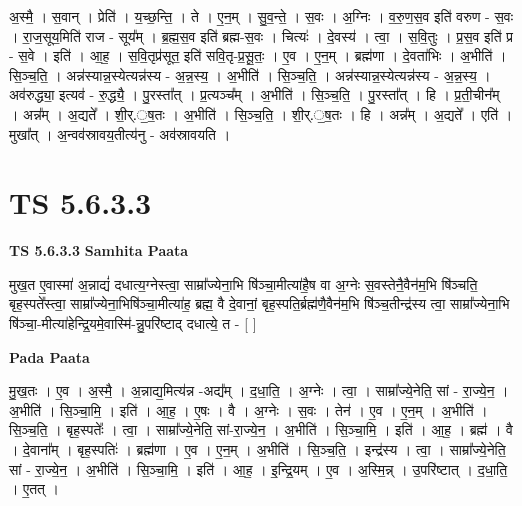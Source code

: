 \documentclass[17pt]{extarticle}
\begin{document}
अ॒स्मै॒ । स॒वान् । प्रेति॑ । य॒च्छ॒न्ति॒ । ते । ए॒न॒म् । सु॒व॒न्ते॒ । स॒वः । अ॒ग्निः । व॒रु॒ण॒स॒व इति॑ वरुण - स॒वः । रा॒ज॒सूय॒मिति॑ राज - सूय᳚म् । ब्र॒ह्म॒स॒व इति॑ ब्रह्म-स॒वः । चित्यः॑ । दे॒वस्य॑ । त्वा॒ । स॒वि॒तुः । प्र॒स॒व इति॑ प्र - स॒वे । इति॑ । आ॒ह॒ । स॒वि॒तृप्र॑सूत॒ इति॑ सवि॒तृ-प्र॒सू॒तः॒ । ए॒व । ए॒न॒म् । ब्रह्म॑णा । दे॒वता॑भिः । अ॒भीति॑ । सि॒ञ्च॒ति॒ । अन्न॑स्यान्न॒स्येत्यन्न॑स्य - अ॒न्न॒स्य॒ । अ॒भीति॑ । सि॒ञ्च॒ति॒ । अन्न॑स्यान्न॒स्येत्यन्न॑स्य - अ॒न्न॒स्य॒ । अव॑रुद्ध्या॒ इत्यव॑ - रु॒द्ध्यै॒ । पु॒रस्ता᳚त् । प्र॒त्यञ्च᳚म् । अ॒भीति॑ । सि॒ञ्च॒ति॒ । पु॒रस्ता᳚त् । हि । प्र॒ती॒चीन᳚म् । अन्न᳚म् । अ॒द्यते᳚ । शी॒र्.॒ष॒तः । अ॒भीति॑ । सि॒ञ्च॒ति॒ । शी॒र्.॒ष॒तः । हि । अन्न᳚म् । अ॒द्यते᳚ । एति॑ । मुखा᳚त् । अ॒न्वव॑स्रावय॒तीत्य॑नु - अव॑स्रावयति ।  \newline




\section*{ TS 5.6.3.3 }

\textbf{TS 5.6.3.3 } \newline
\textbf{Samhita Paata} \newline

मुख॒त ए॒वास्मा॑ अ॒न्नाद्यं॑ दधात्य॒ग्नेस्त्वा॒ साम्रा᳚ज्येना॒भि षि॑ञ्चा॒मीत्या॑है॒ष वा अ॒ग्नेः स॒वस्तेनै॒वैन॑म॒भि षि॑ञ्चति॒ बृह॒स्पते᳚स्त्वा॒ साम्रा᳚ज्येना॒भिषि॑ञ्चा॒मीत्या॑ह॒ ब्रह्म॒ वै दे॒वानां॒ बृह॒स्पति॒र्ब्रह्म॑णै॒वैन॑म॒भि षि॑ञ्च॒तीन्द्र॑स्य त्वा॒ साम्रा᳚ज्येना॒भि षि॑ञ्चा॒-मीत्या॑हेन्द्रि॒यमे॒वास्मि॑-न्नु॒परि॑ष्टाद् दधात्ये॒ त - [  ] \newline

\textbf{Pada Paata} \newline

मु॒ख॒तः । ए॒व । अ॒स्मै॒ । अ॒न्नाद्य॒मित्य॑न्न -अद्य᳚म् । द॒धा॒ति॒ । अ॒ग्नेः । त्वा॒ । साम्रा᳚ज्ये॒नेति॒ सां - रा॒ज्ये॒न॒ । अ॒भीति॑ । सि॒ञ्चा॒मि॒ । इति॑ । आ॒ह॒ । ए॒षः । वै । अ॒ग्नेः । स॒वः । तेन॑ । ए॒व । ए॒न॒म् । अ॒भीति॑ । सि॒ञ्च॒ति॒ । बृह॒स्पतेः᳚ । त्वा॒ । साम्रा᳚ज्ये॒नेति॒ सां-रा॒ज्ये॒न॒ । अ॒भीति॑ । सि॒ञ्चा॒मि॒ । इति॑ । आ॒ह॒ । ब्रह्म॑ । वै । दे॒वाना᳚म् । बृह॒स्पतिः॑ । ब्रह्म॑णा । ए॒व । ए॒न॒म् । अ॒भीति॑ । सि॒ञ्च॒ति॒ । इन्द्र॑स्य । त्वा॒ । साम्रा᳚ज्ये॒नेति॒ सां - रा॒ज्ये॒न॒ । अ॒भीति॑ । सि॒ञ्चा॒मि॒ । इति॑ । आ॒ह॒ । इ॒न्द्रि॒यम् । ए॒व । अ॒स्मि॒न्न् । उ॒परि॑ष्टात् । द॒धा॒ति॒ । ए॒तत् ।  \newline
\end{document}
